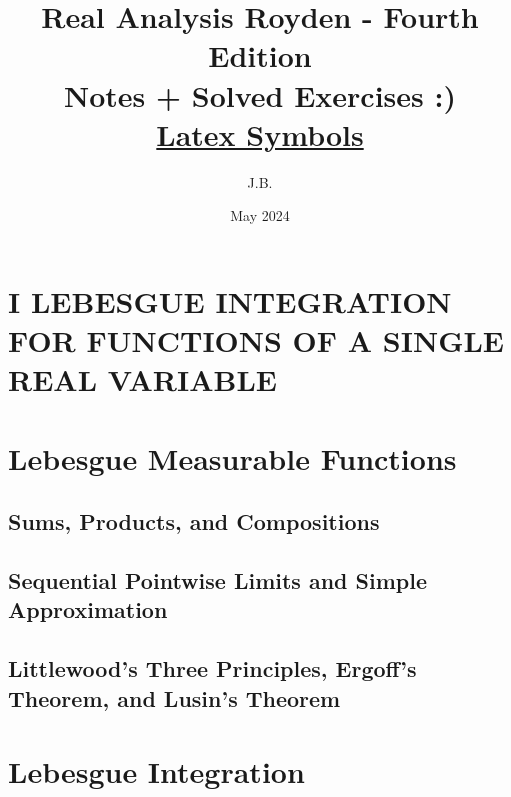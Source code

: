\documentclass[a4paper,10pt]{book}
\title{Real Analysis Royden - Fourth Edition\\
	\large Notes + Solved Exercises :) \\
	\large \href{https://latex-programming.fandom.com/wiki/List_of_LaTeX_symbols}{Latex Symbols}
}
\author{J.B.}
\date{\small May 2024}
\theoremstyle{plain} %
\begin{document}
\maketitle
\tableofcontents

\clearpage{}

\setcounter{chapter}{0}
\chapter*{I LEBESGUE INTEGRATION FOR FUNCTIONS OF A SINGLE REAL VARIABLE}
\setcounter{chapter}{0}




























\chapter{Lebesgue Measurable Functions}

\section{Sums, Products, and Compositions}
\section{Sequential Pointwise Limits and Simple Approximation}
\section{Littlewood's Three Principles, Ergoff's Theorem, and Lusin's Theorem}

\chapter{Lebesgue Integration}
\end{document}
